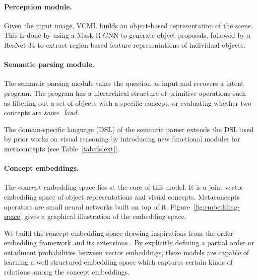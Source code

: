 \documentclass{article}
\newcommand{\fig}[1]{Figure~\ref{#1}}
\newcommand{\tbl}[1]{Table~\ref{#1}}
\newcommand{\model}{VCML\xspace}
\newcommand{\myparagraph}[1]{\vspace{-10pt}\paragraph{#1}}
\begin{document}
 \paragraph{Perception module.}
Given the input image, \model builds an object-based representation of the scene. This is done by using a Mask R-CNN \citep{He2017Mask} to generate object proposals, followed by a ResNet-34 \citep{He2015Deep} to extract region-based feature representations of individual objects.




\myparagraph{Semantic parsing module.}
The semantic parsing module takes the question as input and recovers a latent program. The program has a hierarchical structure of primitive operations such as filtering out a set of objects with a specific concept, or evaluating whether two concepts are {\it same\_kind}.

The domain-specific language (DSL) of the semantic parser extends the DSL used by prior works on visual reasoning \citep{Johnson2017CLEVR,Hudson2019GQA} by introducing new functional modules for metaconcepts (see \tbl{tab:dslext}).

\myparagraph{Concept embeddings.}


The concept embedding space lies at the core of this model. It is a joint vector embedding space of object representations and visual concepts. Metaconcepts operators are small neural networks built on top of it. \fig{fig:embedding-space} gives a graphical illustration of the embedding space.

We build the concept embedding space drawing inspirations from the order-embedding framework \citep{Ivan2015OE} and its extensions \citep{lai2017POE, vilnis2018BoxEmbedding}.
By explicitly defining a partial order or entailment probabilities between vector embeddings, these models are capable of learning a well structured embedding space which captures certain kinds of relations among the concept embeddings.
\end{document}
